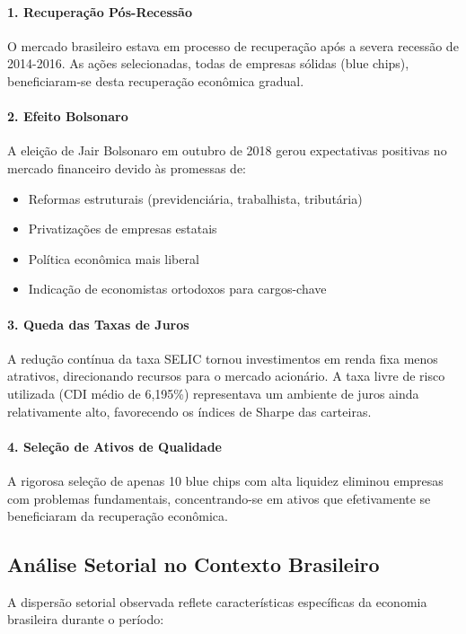 \paragraph{1. Recuperação Pós-Recessão}
O mercado brasileiro estava em processo de recuperação após a severa recessão de 2014-2016. As ações selecionadas, todas de empresas sólidas (blue chips), beneficiaram-se desta recuperação econômica gradual.

\paragraph{2. Efeito Bolsonaro}
A eleição de Jair Bolsonaro em outubro de 2018 gerou expectativas positivas no mercado financeiro devido às promessas de:
\begin{itemize}
    \item Reformas estruturais (previdenciária, trabalhista, tributária)
    \item Privatizações de empresas estatais
    \item Política econômica mais liberal
    \item Indicação de economistas ortodoxos para cargos-chave
\end{itemize}

\paragraph{3. Queda das Taxas de Juros}
A redução contínua da taxa SELIC tornou investimentos em renda fixa menos atrativos, direcionando recursos para o mercado acionário. A taxa livre de risco utilizada (CDI médio de 6,195\%) representava um ambiente de juros ainda relativamente alto, favorecendo os índices de Sharpe das carteiras.

\paragraph{4. Seleção de Ativos de Qualidade}
A rigorosa seleção de apenas 10 blue chips com alta liquidez eliminou empresas com problemas fundamentais, concentrando-se em ativos que efetivamente se beneficiaram da recuperação econômica.

\subsection{Análise Setorial no Contexto Brasileiro}

A dispersão setorial observada reflete características específicas da economia brasileira durante o período:

